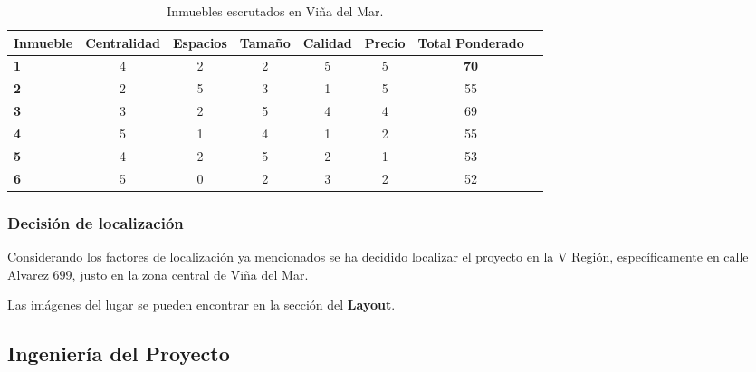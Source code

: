 \begin{table}[htb!]
\centering
\begin{tabular}{|l|c|c|c|c|c|c|c|}
\hline
\textbf{Inmueble} & \textbf{Centralidad}   & \textbf{Espacios}  &
\textbf{Tamaño} & \textbf{Calidad} & \textbf{Precio} & \textbf{Total Ponderado}\\
\hline
\textbf{1}   & 4& 2 & 2  & 5 &  5  &  \textbf{70} \\%
\textbf{2}   & 2& 5 & 3  & 1 &  5  & 55\\  %
\textbf{3}   & 3& 2 & 5  & 4 &  4  & 69\\ %
\textbf{4}   & 5& 1 & 4  & 1 &  2  & 55\\  %
\textbf{5}   & 4& 2 & 5  & 2 &  1  & 53\\  %
\textbf{6}   & 5& 0 & 2  & 3 &  2  & 52\\  %
\hline
\end{tabular}
\caption{Inmuebles escrutados en Viña del Mar.}
\label{tab:direcciones}
\end{table}

\subsubsection{Decisión de localización}

Considerando los factores de localización ya mencionados se ha decidido localizar el proyecto en 
la V Región, específicamente en calle Alvarez 699, justo en la zona central de Viña del Mar.

Las imágenes del lugar se pueden encontrar en la sección del \textbf{Layout}.


\subsection{Ingeniería del Proyecto}

%


